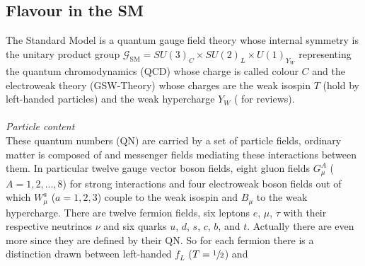 \subsection{Flavour in the SM}
The Standard Model is a quantum gauge field theory whose internal symmetry is the unitary product group $\mathcal{G}_\text{SM}=SU(3)_C\times SU(2)_L\times U(1)_{Y_W}$ representing
the quantum chromodynamics (QCD) whose charge is called colour $C$ and the electroweak theory (GSW-Theory) whose charges are the weak isospin $T$ 
(hold by left-handed particles) and the weak hypercharge $Y_W$ (\cite{Peskin}\cite{MDSchwartz}\cite{Langacker} for reviews). 
\\ \\ \textit{Particle content}\\
\noindent These quantum numbers (QN) are carried by a set of particle fields, ordinary matter is composed
of and messenger fields mediating these interactions between them. In particular twelve gauge vector boson fields, eight gluon fields $G^A_\mu$ ($A=1,2,...,8$)
for strong 
interactions and four electroweak boson fields out of which $W^a_\mu$ ($a=1,2,3$) couple to the weak isospin and $B_\mu$ to the weak hypercharge. There are twelve
fermion fields, six leptons $e$, $\mu$, $\tau$ with their respective neutrinos $\nu$ and six quarks $u$, $d$, $s$, $c$, $b$, and $t$. Actually there
are even more since they are defined by their QN. So for each fermion there is a distinction drawn between left-handed $f_L$ ($T=\sfrac12$) and 
